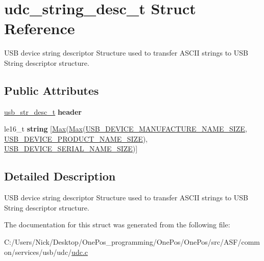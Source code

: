 \hypertarget{structudc__string__desc__t}{\section{udc\-\_\-string\-\_\-desc\-\_\-t Struct Reference}
\label{structudc__string__desc__t}
}


U\-S\-B device string descriptor Structure used to transfer A\-S\-C\-I\-I strings to U\-S\-B String descriptor structure.  


\subsection*{Public Attributes}
\begin{DoxyCompactItemize}
\item 
\hypertarget{structudc__string__desc__t_a2e3d32221a0a7ffb3edc623b2fab91e2}{\hyperlink{structusb__str__desc__t}{usb\-\_\-str\-\_\-desc\-\_\-t} {\bfseries header}}\label{structudc__string__desc__t_a2e3d32221a0a7ffb3edc623b2fab91e2}

\item 
\hypertarget{structudc__string__desc__t_afa37487318dd377251b7a7fe19f21837}{le16\-\_\-t {\bfseries string} \mbox{[}\hyperlink{group__group__xmega__utils_ga4886a8f966a69949cefc46a6a3468006}{Max}(\hyperlink{group__group__xmega__utils_ga4886a8f966a69949cefc46a6a3468006}{Max}(\hyperlink{group__udc__group__interne_gac2dafd8d9efe73f2709291818829a79b}{U\-S\-B\-\_\-\-D\-E\-V\-I\-C\-E\-\_\-\-M\-A\-N\-U\-F\-A\-C\-T\-U\-R\-E\-\_\-\-N\-A\-M\-E\-\_\-\-S\-I\-Z\-E}, \hyperlink{group__udc__group__interne_ga76a9e0f1f322165feaf0a8f2f583ea8f}{U\-S\-B\-\_\-\-D\-E\-V\-I\-C\-E\-\_\-\-P\-R\-O\-D\-U\-C\-T\-\_\-\-N\-A\-M\-E\-\_\-\-S\-I\-Z\-E}), \hyperlink{group__udc__group__interne_gacf4c1ef7c6001ee2b919e81143543899}{U\-S\-B\-\_\-\-D\-E\-V\-I\-C\-E\-\_\-\-S\-E\-R\-I\-A\-L\-\_\-\-N\-A\-M\-E\-\_\-\-S\-I\-Z\-E})\mbox{]}}\label{structudc__string__desc__t_afa37487318dd377251b7a7fe19f21837}

\end{DoxyCompactItemize}


\subsection{Detailed Description}
U\-S\-B device string descriptor Structure used to transfer A\-S\-C\-I\-I strings to U\-S\-B String descriptor structure. 

The documentation for this struct was generated from the following file\-:\begin{DoxyCompactItemize}
\item 
C\-:/\-Users/\-Nick/\-Desktop/\-One\-Pos\-\_\-programming/\-One\-Pos/\-One\-Pos/src/\-A\-S\-F/common/services/usb/udc/\hyperlink{udc_8c}{udc.\-c}\end{DoxyCompactItemize}
